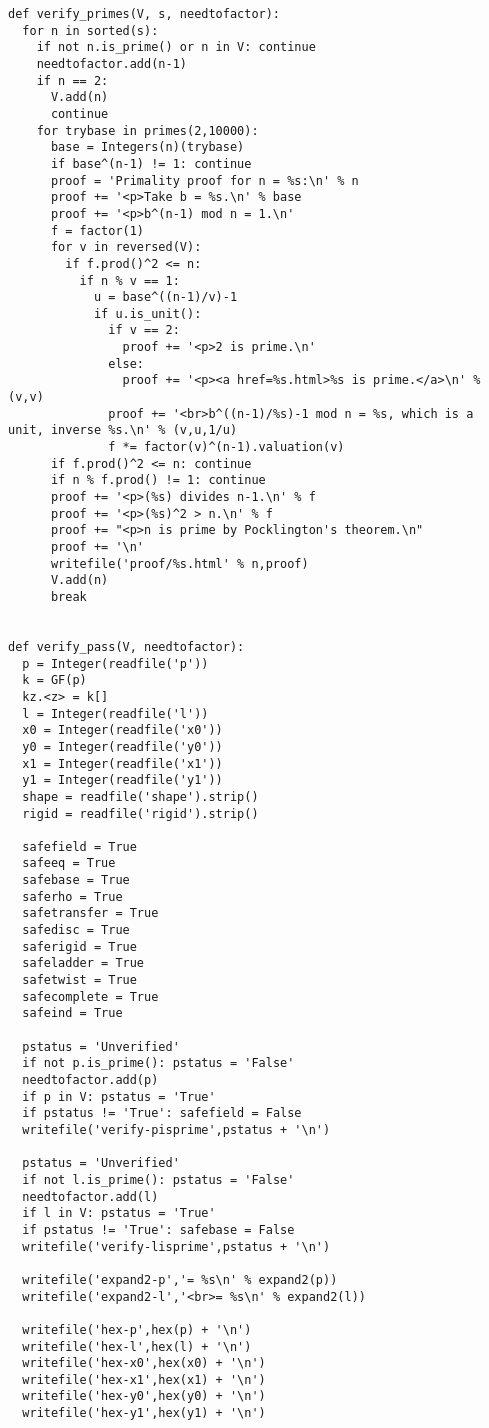 \begin{lstlisting}
def verify_primes(V, s, needtofactor):
  for n in sorted(s):
    if not n.is_prime() or n in V: continue
    needtofactor.add(n-1)
    if n == 2:
      V.add(n)
      continue
    for trybase in primes(2,10000):
      base = Integers(n)(trybase)
      if base^(n-1) != 1: continue
      proof = 'Primality proof for n = %s:\n' % n
      proof += '<p>Take b = %s.\n' % base
      proof += '<p>b^(n-1) mod n = 1.\n'
      f = factor(1)
      for v in reversed(V):
        if f.prod()^2 <= n:
          if n % v == 1:
            u = base^((n-1)/v)-1
            if u.is_unit():
              if v == 2:
                proof += '<p>2 is prime.\n'
              else:
                proof += '<p><a href=%s.html>%s is prime.</a>\n' % (v,v)
              proof += '<br>b^((n-1)/%s)-1 mod n = %s, which is a unit, inverse %s.\n' % (v,u,1/u)
              f *= factor(v)^(n-1).valuation(v)
      if f.prod()^2 <= n: continue
      if n % f.prod() != 1: continue
      proof += '<p>(%s) divides n-1.\n' % f
      proof += '<p>(%s)^2 > n.\n' % f
      proof += "<p>n is prime by Pocklington's theorem.\n"
      proof += '\n'
      writefile('proof/%s.html' % n,proof)
      V.add(n)
      break


def verify_pass(V, needtofactor):
  p = Integer(readfile('p'))
  k = GF(p)
  kz.<z> = k[]
  l = Integer(readfile('l'))
  x0 = Integer(readfile('x0'))
  y0 = Integer(readfile('y0'))
  x1 = Integer(readfile('x1'))
  y1 = Integer(readfile('y1'))
  shape = readfile('shape').strip()
  rigid = readfile('rigid').strip()

  safefield = True
  safeeq = True
  safebase = True
  saferho = True
  safetransfer = True
  safedisc = True
  saferigid = True
  safeladder = True
  safetwist = True
  safecomplete = True
  safeind = True

  pstatus = 'Unverified'
  if not p.is_prime(): pstatus = 'False'
  needtofactor.add(p)
  if p in V: pstatus = 'True'
  if pstatus != 'True': safefield = False
  writefile('verify-pisprime',pstatus + '\n')

  pstatus = 'Unverified'
  if not l.is_prime(): pstatus = 'False'
  needtofactor.add(l)
  if l in V: pstatus = 'True'
  if pstatus != 'True': safebase = False
  writefile('verify-lisprime',pstatus + '\n')

  writefile('expand2-p','= %s\n' % expand2(p))
  writefile('expand2-l','<br>= %s\n' % expand2(l))
  
  writefile('hex-p',hex(p) + '\n')
  writefile('hex-l',hex(l) + '\n')
  writefile('hex-x0',hex(x0) + '\n')
  writefile('hex-x1',hex(x1) + '\n')
  writefile('hex-y0',hex(y0) + '\n')
  writefile('hex-y1',hex(y1) + '\n')


\end{lstlisting}
